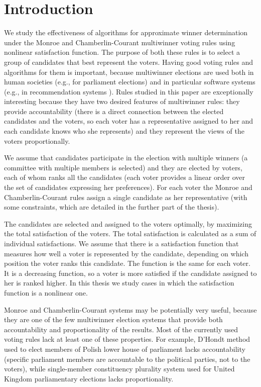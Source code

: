 \chapter{Introduction}
\label{cha:introduction}

We study the effectiveness of algorithms for approximate winner determination under the \linebreak Monroe \cite{8} and Chamberlin-Courant \cite{9} multiwinner voting rules using nonlinear satisfaction function. The purpose of both these rules is to select a group of candidates that best represent the voters. Having good voting rules and algorithms for them is important, because multiwinner elections are used both in human societies (e.g., for parliament elections) and in particular software systems (e.g., in recommendation systems \cite{4}). Rules studied in this paper are exceptionally interesting because they have two desired features of multiwinner rules: they provide accountability (there is a direct connection between the elected candidates and the voters, so each voter has a representative assigned to her and each candidate knows who she represents) and they represent the views of the voters proportionally.

We assume that candidates participate in the election with multiple winners (a committee with multiple members is selected) and they are elected by voters, each of whom ranks all the candidates (each voter provides a linear order over the set of candidates expressing her preferences). For each voter the Monroe and Chamberlin-Courant rules assign a single candidate as her representative (with some constraints, which are detailed in the further part of the thesis).

The candidates are selected and assigned to the voters optimally, by maximizing the total satisfaction of the voters. The total satisfaction is calculated as a sum of individual satisfactions. We assume that there is a  satisfaction function that measures how well a voter is represented by the candidate, depending on which position the voter ranks this candidate. The function is the same for each voter. It is a decreasing function, so a voter is more satisfied if the candidate assigned to her is ranked higher. In this thesis we study cases in which the satisfaction function is a nonlinear one.

Monroe and Chamberlin-Courant systems may be potentially very useful, because they are one of the few multiwinner election systems that provide both accountability and proportionality of the results. Most of the currently used voting rules lack at least one of these properties. For example, D'Hondt method used to elect members of Polish lower house of parliament lacks accountability (specific parliament members are accountable to the political parties, not to the voters), while single-member constituency plurality system used for United Kingdom parliamentary elections lacks proportionality.

